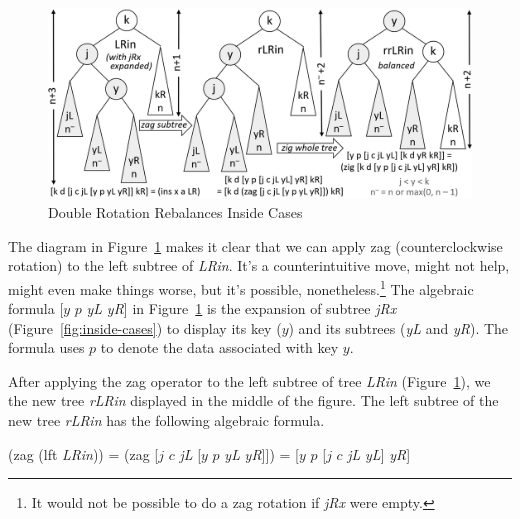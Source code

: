 \begin{figure}
\begin{center}
\includegraphics[scale=1]{images-cmyk/dbl-rotation}
\end{center}
\caption{Double Rotation Rebalances Inside Cases}
\label{fig:dbl-rotation}
\end{figure}

The diagram in Figure~\ref{fig:dbl-rotation}
makes it clear that we can apply \textsf{zag}
(counterclockwise rotation)
to the left subtree of \emph{LRin}.
It's a counterintuitive move, might not help, might even make things worse,
but it's possible, nonetheless.\footnote{\label{no-zag}It would not be possible
to do a \textsf{zag} rotation if \emph{jRx} were empty.}
The algebraic formula \textsf{[$y$ $p$} \emph{yL} \emph{yR}\textsf{]} in Figure~\ref{fig:dbl-rotation}
is the expansion of subtree \emph{jRx} (Figure~\ref{fig:inside-cases}) to display
its key ($y$) and its subtrees (\emph{yL} and \emph{yR}).
The formula uses $p$ to denote the data associated with key $y$.

After applying the \textsf{zag} operator to the left subtree of tree \emph{LRin}
(Figure~\ref{fig:dbl-rotation}), we the new tree \emph{rLRin} displayed in
the middle of the figure. The left subtree of the new tree \emph{rLRin} has the following algebraic formula.
\begin{center}
\textsf{(zag (lft} \emph{LRin}\textsf{))} =
\textsf{(zag [$j$ $c$} \emph{jL} \textsf{[$y$ $p$} \emph{yL} \emph{yR}\textsf{]])} =
\textsf{[$y$ $p$ [$j$ $c$} \emph{jL} \emph{yL}\textsf{]} \emph{yR}\textsf{]}
\end{center}

